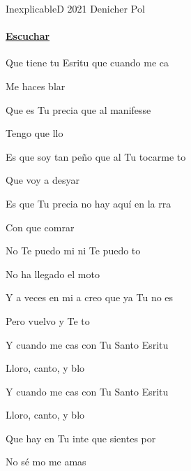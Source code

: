 \documentclass[12pt, spanish]{book}
\begin{document}
    \begin{song}{Inexplicable}{D}
        {2021} %
        {Denicher Pol}
        {} %
        {}
        \ifChordBk
            \paragraph{\mbox{}\hfill\protect\href{https://open.spotify.com/intl-es/track/5L4hDAnKu7btTTyM3ucm24}{Escuchar}\mbox{}\hfill}
        \fi


        \begin{SBOpGroup}
            Que tiene tu Esritu que cuando me ca

            Me haces blar

            Que es Tu precia que al manifesse

            Tengo que llo

            Es que soy tan peño que al Tu tocarme to

            Que voy a desyar

            Es que Tu precia no hay aquí en la rra

            Con que comrar
        \end{SBOpGroup}

        \begin{SBChorus}
            No Te puedo mi ni Te puedo to

            No ha llegado el moto

            Y a veces en mi a creo que ya Tu no es

            Pero vuelvo y Te to

            Y cuando me cas con Tu Santo Esritu

            Lloro, canto, y blo

            Y cuando me cas con Tu Santo Esritu

            Lloro, canto, y blo
        \end{SBChorus}

        \begin{SBOpGroup}
            Que hay en Tu inte que sientes por 

            No sé mo me amas


\end{SBOpGroup}
\end{song}
\end{document}
